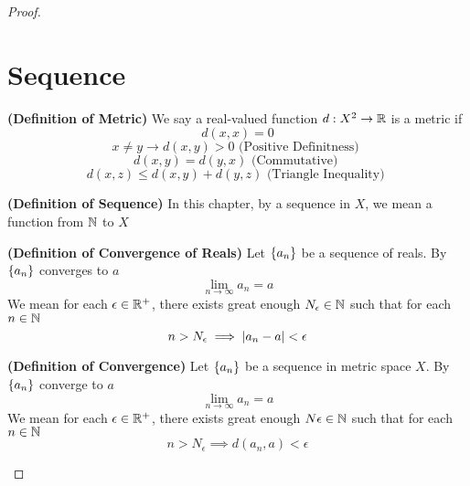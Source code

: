 \documentclass{report}
\begin{document}
\begin{proof}
\section{Sequence}
\begin{definition}
\label{3.1.1}
\textbf{(Definition of Metric)} We say a real-valued function $d:X^2\rightarrow \mathbb{R}$ is a metric if
\begin{equation}
d(x,x)=0 
\end{equation}
\begin{equation}
x\neq y\longrightarrow d(x,y)>0\text{ (Positive Definitness) }
\end{equation}
\begin{equation}
d(x,y)=d(y,x)\text{ (Commutative) }
\end{equation}
\begin{equation}
d(x,z)\leq d(x,y)+d(y,z)\text{ (Triangle Inequality) }
\end{equation}
\end{definition}
\begin{definition}
\label{3.1.2}
\textbf{(Definition of Sequence)} In this chapter, by a sequence in $X$, we mean a function from  $\mathbb{N}$ to  $X$
\end{definition}
\begin{definition}
\label{3.1.3}
\textbf{(Definition of Convergence of Reals)} Let $\{ a_n \}$ be a sequence of reals. By $\{ a_n \}$ converges to $a$ 
\begin{equation}
\lim_{n\to\infty} a_n=a
\end{equation}
We mean for each $\epsilon \in\mathbb{R}^+$, there exists great enough $N_\epsilon \in\mathbb{N}$  such that for each $n\in\mathbb{N}$ 
\begin{equation}
n>N_\epsilon \implies |a_n-a|<\epsilon 
\end{equation}
\end{definition}
\begin{definition}
\label{3.1.4}
\textbf{(Definition of Convergence)} Let $\{ a_n \}$ be a sequence in metric space $X$. By $\{ a_n \}$ converge to $a$
\begin{equation}
\lim_{n\to\infty}a_n=a
\end{equation}
We mean for each $\epsilon \in\mathbb{R}^+$, there exists great enough $N\epsilon \in\mathbb{N}$ such that for each $n\in\mathbb{N}$
 \begin{equation}
n>N_\epsilon \implies d(a_n,a)<\epsilon 
\end{equation}

\end{definition}
\end{proof}
\end{document}
